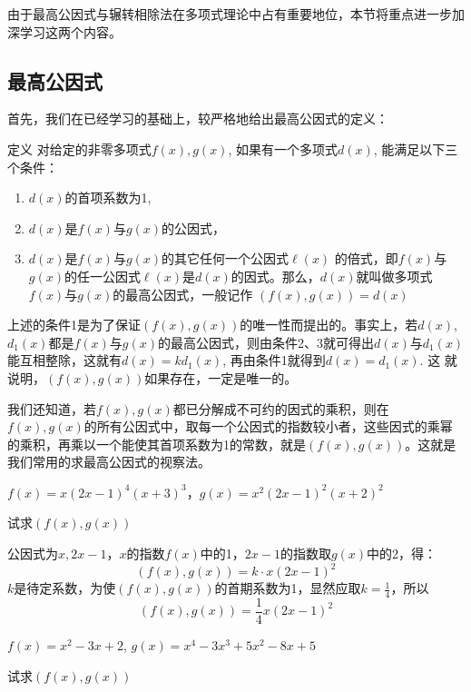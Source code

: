 由于最高公因式与辗转相除法在多项式理论中占有重要地位，本节将重点进一步加深学习这两个内容。

\subsection{最高公因式}

首先，我们在已经学习的基础上，较严格地给出最高公因式的定义：

\begin{blk}{定义}
 对给定的非零多项式$f(x),g(x)$, 如果有一个多项式$d(x)$, 能满足以下三个条件：   
\begin{enumerate}
    \item $d(x)$的首项系数为1,
    \item $d(x)$是$f(x)$与$g(x)$的公因式，
    \item $d(x)$是$f(x)$与$g(x)$的其它任何一个公因式$\ell(x)$
    的倍式，即$f(x)$与$g(x)$的任一公因式$\ell(x)$是$d(x)$的因式。那么，$d(x)$就叫做多项式$f(x)$与$g(x)$的最高公因式，一般记作
    $(f (x) ,g (x) ) =d (x)$
\end{enumerate}
\end{blk}

上述的条件1是为了保证$(f(x),g(x))$的唯一性而提出的。事实上，若$d(x)$, $d_1(x)$都是$f(x)$与$g(x)$的最高公因式，则由条件2、3就可得出$d(x)$与$d_1(x)$能互相整除，这就有$d(x)=kd_1(x)$, 再由条件1就得到$d(x)=d_1(x)$. 这
就说明，$(f(x),g(x))$如果存在，一定是唯一的。

我们还知道，若$f(x),g(x)$都已分解成不可约的因式的乘积，则在$f(x),g(x)$的所有公因式中，取每一个公因式的指数较小者，这些因式的乘幂的乘积，再乘以一个能使其首项系数为1的常数，就是$(f(x),g(x))$。这就是我们常用的求最高公因式的视察法。


\begin{example}
$f(x)=x(2x-1)^4(x+3)^3$，$g(x)=x^2(2x-1)^2(x+2)^2$

试求$(f(x),g(x))$
\end{example}

\begin{solution}
    公因式为$x,2x-1$，$x$的指数$f(x)$中的1，$2x-1$的指数取$g(x)$中的2，得：
\[(f(x),g(x))=k\cdot x (2x-1)^2\]
$k$是待定系数，为使$(f(x),g(x))$的首期系数为1，显然应取$k=\frac{1}{4}$，所以
\[(f(x),g(x))=\frac{1}{4}  x (2x-1)^2\]
\end{solution}

\begin{example}
$f(x)=x^2-3x+2$, $g(x)=x^4-3x^3+5x^2-8x+5$

试求$(f(x),g(x))$
\end{example}

